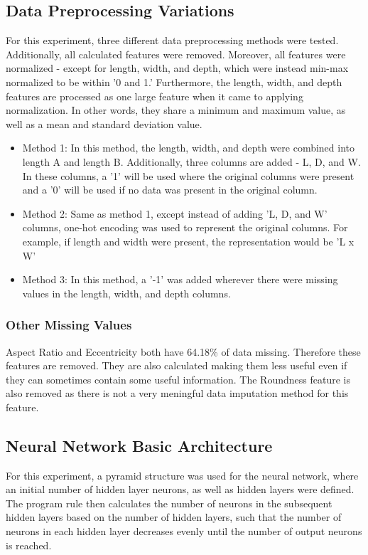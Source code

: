 \documentclass[conference]{IEEEtran}
\begin{document}
\subsection{Data Preprocessing Variations}

For this experiment, three different data preprocessing methods were tested. Additionally, all calculated features were removed. Moreover, all features were normalized - except for length, width, and depth, which were instead min-max normalized to be within '0 and 1.' Furthermore, the length, width, and depth features are processed as one large feature when it came to applying normalization. In other words, they share a minimum and maximum value, as well as a mean and standard deviation value.

\begin{itemize}
    \item Method 1: In this method, the length, width, and depth were combined into length A and length B. Additionally, three columns are added - L, D, and W. In these columns, a '1' will be used where the original columns were present and a '0' will be used if no data was present in the original column. 
    \item Method 2: Same as method 1, except instead of adding 'L, D, and W' columns, one-hot encoding was used to represent the original columns. For example, if length and width were present, the representation would be 'L x W'
    \item Method 3: In this method, a '-1' was added wherever there were missing values in the length, width, and depth columns. 
\end{itemize}

\subsubsection{Other Missing Values}

Aspect Ratio and Eccentricity both have 64.18\% of data missing. Therefore these features are removed. They are also calculated making them less useful even if they can sometimes contain some useful information. The Roundness feature is also removed as there is not a very meningful data imputation method for this feature.

\subsection{Neural Network Basic Architecture}

For this experiment, a pyramid structure was used for the neural network, where an initial number of hidden layer neurons, as well as hidden layers were defined. The program rule then calculates the number of neurons in the subsequent hidden layers based on the number of hidden layers, such that the number of neurons in each hidden layer decreases evenly until the number of output neurons is reached. 
\end{document}
